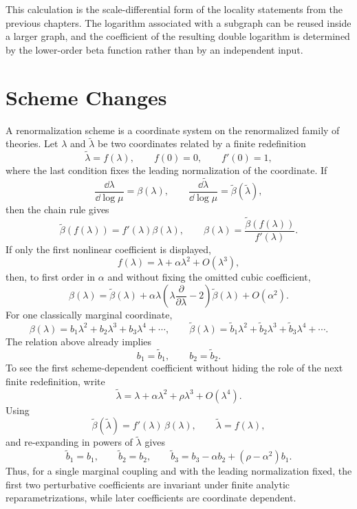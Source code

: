 This calculation is the scale-differential form of the locality statements
from the previous chapters.  The logarithm associated with a subgraph can be
reused inside a larger graph, and the coefficient of the resulting double
logarithm is determined by the lower-order beta function rather than by an
independent input.

\section{Scheme Changes}

A renormalization scheme is a coordinate system on the renormalized family of
theories.  Let \(\lambda\) and \(\widetilde\lambda\) be two coordinates related
by a finite redefinition
\[
  \widetilde\lambda=f(\lambda),
  \qquad
  f(0)=0,\qquad f'(0)=1,
\]
where the last condition fixes the leading normalization of the coordinate.
If
\[
  \frac{\dd\lambda}{\dd\log\mu}=\beta(\lambda),
  \qquad
  \frac{\dd\widetilde\lambda}{\dd\log\mu}
  =
  \widetilde\beta(\widetilde\lambda),
\]
then the chain rule gives
\[
  \widetilde\beta(f(\lambda))=f'(\lambda)\beta(\lambda),
  \qquad
  \beta(\lambda)=\frac{\widetilde\beta(f(\lambda))}{f'(\lambda)}.
\]
If only the first nonlinear coefficient is displayed,
\[
  f(\lambda)=\lambda+\alpha\lambda^2+O(\lambda^3),
\]
then, to first order in \(\alpha\) and without fixing the omitted cubic
coefficient,
\[
  \beta(\lambda)
  =
  \widetilde\beta(\lambda)
  +
  \alpha\lambda
  \left(
    \lambda\frac{\partial}{\partial\lambda}-2
  \right)
  \widetilde\beta(\lambda)
  +
  O(\alpha^2).
\]
For one classically marginal coordinate,
\[
  \beta(\lambda)=b_1\lambda^2+b_2\lambda^3+b_3\lambda^4+\cdots,
  \qquad
  \widetilde\beta(\lambda)
  =
  \widetilde b_1\lambda^2+\widetilde b_2\lambda^3
  +\widetilde b_3\lambda^4+\cdots .
\]
The relation above already implies
\[
  b_1=\widetilde b_1,
  \qquad
  b_2=\widetilde b_2 .
\]
To see the first scheme-dependent coefficient without hiding the role of the
next finite redefinition, write
\[
  \widetilde\lambda
  =
  \lambda+\alpha\lambda^2+\rho\lambda^3+O(\lambda^4).
\]
Using
\[
  \widetilde\beta(\widetilde\lambda)
  =
  f'(\lambda)\,\beta(\lambda),
  \qquad
  \widetilde\lambda=f(\lambda),
\]
and re-expanding in powers of \(\widetilde\lambda\) gives
\[
  \widetilde b_1=b_1,\qquad
  \widetilde b_2=b_2,\qquad
  \widetilde b_3
  =
  b_3-\alpha b_2+(\rho-\alpha^2)b_1 .
\]
Thus, for a single marginal coupling and with the leading normalization fixed,
the first two perturbative coefficients are invariant under finite analytic
reparametrizations, while later coefficients are coordinate dependent.

